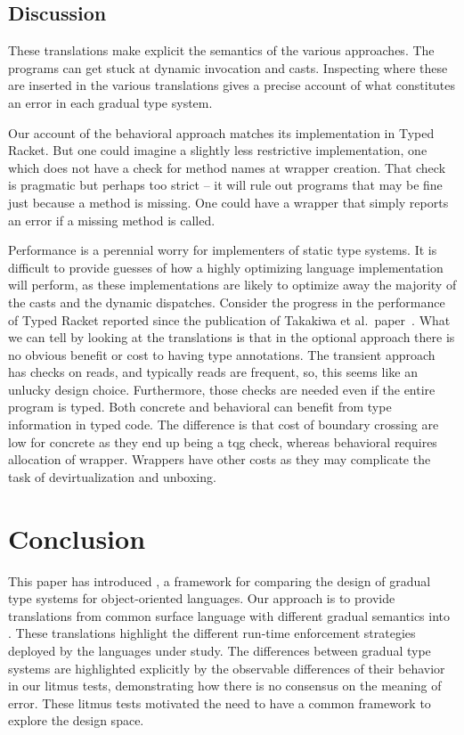 \documentclass[USenglish]{tex/lipics-v2016}f
\begin{document}
\subsection{Discussion}

These translations make explicit the semantics of the various approaches.  The
programs can get stuck at dynamic invocation and casts. Inspecting where these
are inserted in the various translations gives a precise account of what
constitutes an error in each gradual type system.

Our account of the behavioral approach matches its implementation in Typed
Racket. But one could imagine a slightly less restrictive implementation,
one which does not have a check for method names at wrapper creation.  That
check is pragmatic but perhaps too strict -- it will rule out programs that
may be fine just because a method is missing. One could have a wrapper that
simply reports an error if a missing method is called.

Performance is a perennial worry for implementers of static type systems.
It is difficult to provide guesses of how a highly optimizing language
implementation will perform, as these implementations are likely to optimize
away the majority of the casts and the dynamic dispatches. Consider the
progress in the performance of Typed Racket reported since the publication
of Takakiwa et al.~paper~\cite{popl16}.  What we can tell by looking at the
translations is that in the optional approach there is no obvious benefit or
cost to having type annotations. The transient approach has checks on reads,
and typically reads are frequent, so, this seems like an unlucky design
choice. Furthermore, those checks are needed even if the entire program is
typed. Both concrete and behavioral can benefit from type information in
typed code.  The difference is that cost of boundary crossing are low for
concrete as they end up being a tqg check, whereas behavioral requires
allocation of wrapper. Wrappers have other costs as they may complicate
the task of devirtualization and unboxing.


\section{Conclusion}

This paper has introduced \kafka, a framework for comparing the design of
gradual type systems for object-oriented languages. Our approach is to
provide translations from common surface language with different gradual
semantics into \kafka. These translations highlight the different run-time
enforcement strategies deployed by the languages under study. The
differences between gradual type systems are highlighted explicitly by the
observable differences of their behavior in our litmus tests, demonstrating
how there is no consensus on the meaning of error.  These litmus tests
motivated the need to have a common framework to explore the design space.
\end{document}
